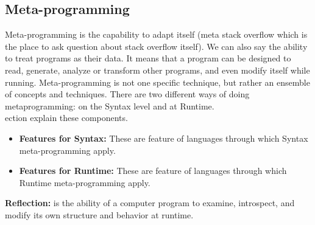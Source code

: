 \documentclass{sig-alternate}
\begin{document}
\subsection{Meta-programming}
Meta-programming is the capability to adapt itself (meta stack overflow which is the place to ask question about stack overflow itself). We can also say the ability to treat programs as their data. It means that a program can be designed to read, generate, analyze or transform other programs, and even modify itself while running. Meta-programming is not one specific technique, but rather an ensemble of concepts and techniques. There are two different ways of doing metaprogramming: on the Syntax level and at Runtime.\\
ection explain these components.
\begin{itemize}
  \item \textbf{Features for Syntax:} These are feature of languages through which Syntax meta-programming apply.
  \item \textbf{Features for Runtime:} These are feature of languages through which Runtime meta-programming apply.
\end{itemize}
\textbf{Reflection:} is the ability of a computer program to examine, introspect, and modify its own structure and behavior at runtime.
\end{document}

